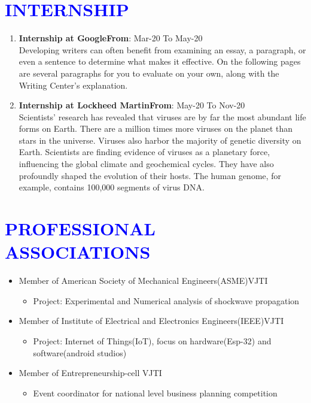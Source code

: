 \documentclass{article}
\begin{document}
\vspace{3pt}
\section*{\large{\textcolor{blue}{\uppercase{Internship}}}}

\vspace{4pt}
\begin{enumerate}
	\item {\textbf{Internship at Google}}\hfill {\textbf{From}}: Mar-20 To May-20\\
	Developing writers can often benefit from examining an essay, a paragraph, or even a sentence to determine what makes it effective. On the following pages are several paragraphs for you to evaluate on your own, along with the Writing Center's explanation.
	\item {\textbf{Internship at Lockheed Martin}}\hfill {\textbf{From}}: May-20 To Nov-20\\
	 Scientists' research has revealed that viruses are by far the most abundant life forms on Earth. There are a million times more viruses on the planet than stars in the universe. Viruses also harbor the majority of genetic diversity on Earth. Scientists are finding evidence of viruses as a planetary force, influencing the global climate and geochemical cycles. They have also profoundly shaped the evolution of their hosts. The human genome, for example, contains 100,000 segments of virus DNA.
\end{enumerate}

\vspace{3pt}
\section*{\large{\textcolor{blue}{\uppercase{Professional Associations}}}}

\vspace{4pt}

\begin{itemize}[noitemsep,nolistsep]
	\item Member of American Society of Mechanical Engineers(ASME)VJTI
	\begin{itemize}[noitemsep,nolistsep]
		\item Project: Experimental and Numerical analysis of shockwave propagation
	\end{itemize}
	\item Member of Institute of Electrical and Electronics Engineers(IEEE)VJTI
	\begin{itemize}[noitemsep,nolistsep]
		\item Project: Internet of Things(IoT), focus on hardware(Esp-32) and software(android studios)
	\end{itemize}
	\item Member of Entrepreneurship-cell VJTI
	\begin{itemize}[noitemsep,nolistsep]
		\item Event coordinator for national level business planning competition
	\end{itemize}
\end{itemize}
\vspace{3pt}
\end{document}
